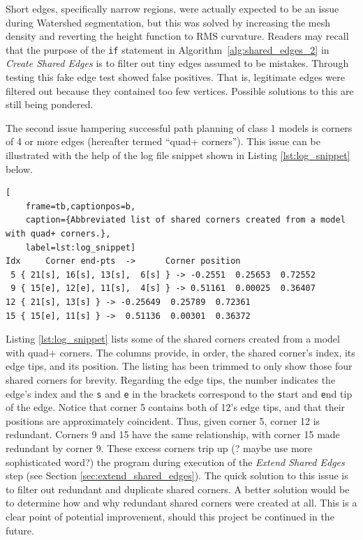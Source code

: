 Short edges, specifically narrow regions, were actually expected to be an issue during Watershed segmentation, but this was solved by increasing the mesh density and reverting the height function to RMS curvature.
Readers may recall that the purpose of the \verb|if| statement in Algorithm~\ref{alg:shared_edges_2} in \textit{Create Shared Edges} is to filter out tiny edges assumed to be mistakes.
Through testing this fake edge test showed false positives.
That is, legitimate edges were filtered out because they contained too few vertices.
Possible solutions to this are still being pondered.

The second issue hampering successful path planning of class 1 models is corners of 4 or more edges (hereafter termed ``quad+ corners'').
This issue can be illustrated with the help of the log file snippet shown in Listing \ref{lst:log_snippet} below.
\begin{lstlisting}[
	frame=tb,captionpos=b,
	caption={Abbreviated list of shared corners created from a model with quad+ corners.},
	label=lst:log_snippet]
Idx 	Corner end-pts	->		Corner position
 5 { 21[s], 16[s], 13[s],  6[s] } -> -0.2551  0.25653  0.72552
 9 { 15[e], 12[e], 11[s],  4[s] } -> 0.51161  0.00025  0.36407
12 { 21[s], 13[s] } -> -0.25649  0.25789  0.72361
15 { 15[e], 11[s] } ->  0.51136  0.00301  0.36372
\end{lstlisting}
Listing \ref{lst:log_snippet} lists some of the shared corners created from a model with quad+ corners.
The columns provide, in order, the shared corner's index, its edge tips, and its position.
The listing has been trimmed to only show those four shared corners for brevity.
Regarding the edge tips, the number indicates the edge's index and the \verb|s| and \verb|e| in the brackets correspond to the \verb|s|tart and \verb|e|nd tip of the edge.
Notice that corner 5 contains both of 12's edge tips, and that their positions are approximately coincident.
Thus, given corner 5, corner 12 is redundant.
Corners 9 and 15 have the same relationship, with corner 15 made redundant by corner 9.
These excess corners trip up (? maybe use more sophisticated word?) the program during execution of the \textit{Extend Shared Edges} step (see Section \ref{sec:extend_shared_edges}).
The quick solution to this issue is to filter out redundant and duplicate shared corners.
A better solution would be to determine how and why redundant shared corners were created at all.
This is a clear point of potential improvement, should this project be continued in the future.

